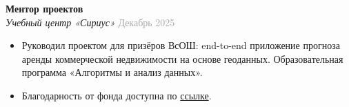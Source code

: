 \documentclass[a4paper,10pt]{article}
\begin{document}
\vspace{2pt}
\noindent\textbf{Ментор проектов}\\
\textit{Учебный центр «Сириус»} \hfill \textcolor{darkgray}{Декабрь 2025}
\begin{itemize}
    \item Руководил проектом для призёров ВсОШ: end-to-end приложение прогноза аренды коммерческой недвижимости на основе геоданных. Образовательная программа «Алгоритмы и анализ данных».
    \item Благодарность от фонда доступна по \href{https://drive.google.com/file/d/1DIMJdSLokiNv5MKVgUTep--zkdSX7Q2H/view}{\color{accent}ссылке}.
\end{itemize}





\end{document}
